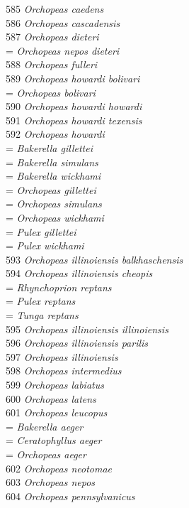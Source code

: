 \documentclass[
]{article}
\begin{document}
585 \emph{Orchopeas caedens}\\
586 \emph{Orchopeas cascadensis}\\
587 \emph{Orchopeas dieteri}\\
= \emph{Orchopeas nepos dieteri}\\
588 \emph{Orchopeas fulleri}\\
589 \emph{Orchopeas howardi bolivari}\\
= \emph{Orchopeas bolivari}\\
590 \emph{Orchopeas howardi howardi}\\
591 \emph{Orchopeas howardi texensis}\\
592 \emph{Orchopeas howardi}\\
= \emph{Bakerella gillettei}\\
= \emph{Bakerella simulans}\\
= \emph{Bakerella wickhami}\\
= \emph{Orchopeas gillettei}\\
= \emph{Orchopeas simulans}\\
= \emph{Orchopeas wickhami}\\
= \emph{Pulex gillettei}\\
= \emph{Pulex wickhami}\\
593 \emph{Orchopeas illinoiensis balkhaschensis}\\
594 \emph{Orchopeas illinoiensis cheopis}\\
= \emph{Rhynchoprion reptans}\\
= \emph{Pulex reptans}\\
= \emph{Tunga reptans}\\
595 \emph{Orchopeas illinoiensis illinoiensis}\\
596 \emph{Orchopeas illinoiensis parilis}\\
597 \emph{Orchopeas illinoiensis}\\
598 \emph{Orchopeas intermedius}\\
599 \emph{Orchopeas labiatus}\\
600 \emph{Orchopeas latens}\\
601 \emph{Orchopeas leucopus}\\
= \emph{Bakerella aeger}\\
= \emph{Ceratophyllus aeger}\\
= \emph{Orchopeas aeger}\\
602 \emph{Orchopeas neotomae}\\
603 \emph{Orchopeas nepos}\\
604 \emph{Orchopeas pennsylvanicus}\\
\end{document}
